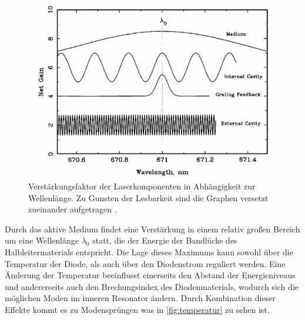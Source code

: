 \begin{figure}
    \centering
    \includegraphics[scale=0.50]{content/pics/net_gain.png}
    \caption{Verstärkungsfaktor der Laserkomponenten in Abhängigkeit zur Wellenlänge. Zu Gunsten der Lesbarkeit sind die Graphen versetzt zueinander 
    aufgetragen \cite{diode_laser_spectroscopy}.}
    \label{fig:net_gain}
\end{figure}

Durch das aktive Medium findet eine Verstärkung in einem relativ großen Bereich um eine Wellenlänge $\lambda_0$ statt, die der Energie der Bandlücke des Halbleitermaterials entspricht. 
Die Lage dieses Maximums kann sowohl über die Temperatur der Diode, als auch über den Diodenstrom reguliert werden. Eine Änderung der Temperatur beeinflusst einerseits 
den Abstand der Energieniveaus und andererseits auch den Brechungsindex des Diodenmaterials, wodurch sich die möglichen Moden im inneren Resonator ändern. 
Durch Kombination dieser Effekte kommt es zu Modensprüngen was in \autoref{fig:temperatur} zu sehen ist. 

